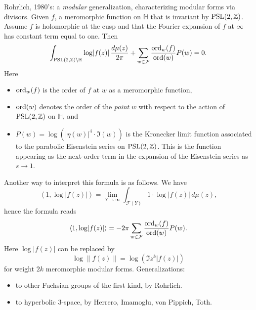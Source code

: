 \documentclass[reqno]{amsart} 
\begin{document}
Rohrlich, 1980's: a \emph{modular} generalization, characterizing modular forms via divisors.  Given $f$, a meromorphic function on $\mathbb{H}$ that is invariant by $\operatorname{PSL}(2,\mathbb{Z})$.  Assume $f$ is holomorphic at the cusp and that the Fourier expansion of $f$ at $\infty$ has constant term equal to one.  Then
\begin{equation*}
  \int_{\operatorname{PSL}(2,\mathbb{Z}) \backslash \mathbb{H}}
  \log \lvert f(z) \rvert
  \, \frac{d \mu(z)}{2 \pi}
  + \sum_{w \in \mathcal{F}}
  \frac{\operatorname{ord}_w(f)}{ \operatorname{ord}(w)} P(w) = 0.
\end{equation*}
Here
\begin{itemize}
\item $\operatorname{ord}_w(f)$ is the order of $f$ at $w$ as a meromorphic function,
\item $\operatorname{ord}(w)$ denotes the order of the \emph{point} $w$ with respect to the action of $\operatorname{PSL}(2,\mathbb{Z})$ on $\mathbb{H}$, and
\item $P(w) = \log \left( \lvert \eta(w) \rvert^4 \cdot \Im(w) \right)$ is the Kronecker limit function associated to the parabolic Eisenstein series on $\operatorname{PSL}(2,\mathbb{Z})$.  This is the function appearing as the next-order term in the expansion of the Eisenstein series as $s \rightarrow 1$.
\end{itemize}
Another way to interpret this formula is as follows.  We have
\begin{equation*}
  \left\langle 1, \log \lvert f(z) \rvert \right\rangle
  = \lim_{Y \rightarrow \infty} \int_{\mathcal{F}(Y)} 1 \cdot \log \lvert f(z) \rvert \, d \mu(z),
\end{equation*}
hence the formula reads
\begin{equation*}
  \left\langle 1, \log \lvert f(z) \rvert \right\rangle = - 2 \pi
  \sum_{w \in \mathcal{F}} \frac{\operatorname{ord}_w(f)}{ \operatorname{ord}(w)} P(w).
\end{equation*}
Here $\log \lvert f(z) \rvert$ can be replaced by
\begin{equation*}
  \log \lVert f(z) \rVert = \log \left( \Im z^k \lvert f(z) \rvert \right)
\end{equation*}
for weight $2 k$ meromorphic modular forms.  Generalizations:
\begin{itemize}
\item to other Fuchsian groups of the first kind, by Rohrlich.
\item to hyperbolic $3$-space, by Herrero, Imamoglu, von Pippich, Toth.
\end{itemize}
\end{document}
